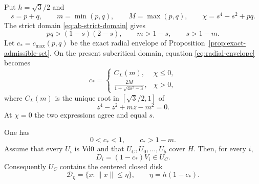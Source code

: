 Put $h=\sqrt3/2$ and
\[
 s=p+q,\qquad m=\min(p,q),\qquad M=\max(p,q),
 \qquad \chi=s^4-s^2+pq.
\]
The strict domain \eqref{eq:ab-strict-domain} gives
\begin{equation}
 pq>(1-s)(2-s),\qquad m>1-s,\qquad s>1-m.         \label{eq:pq-domain}
\end{equation}
Let $c_*=c_{\max}(p,q)$ be the exact radial envelope of
Proposition~\ref{prop:exact-admissible-set}.  On the present subcritical
domain, equation \eqref{eq:radial-envelope} becomes
\begin{equation}
 c_*=\begin{cases}
 C_L(m),&\chi\le0,\\[1mm]
 \displaystyle\frac{2M}{1+\sqrt{4s^2-3}},&\chi>0,
 \end{cases}                                    \label{eq:core-cstar}
\end{equation}
where $C_L(m)$ is the unique root in $[\sqrt3/2,1]$ of
\[
 z^4-z^2+mz-m^2=0.
\]
At $\chi=0$ the two expressions agree and equal $s$.

\begin{lemma}
\label{lem:symmetric-core-witness}
One has
\begin{equation}
 0<c_*<1,\qquad c_*>1-m.                         \label{eq:cstar-bounds}
\end{equation}
Assume that every $U_i$ is $\mathrm{Vd0}$ and that
$U_C,U_0,\ldots,U_5$ cover $H$.  Then, for every $i$,
\[
 D_i=(1-c_*)V_i\in U_C.
\]
Consequently $U_C$ contains the centered closed disk
\begin{equation}
 \mathcal D_\eta=\{x:\lVert x\rVert\le\eta\},
 \qquad \eta=h(1-c_*).                           \label{eq:forced-disk}
\end{equation}
\end{lemma}


